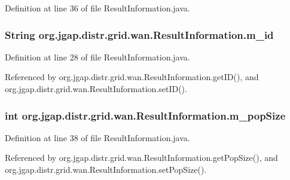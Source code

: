 Definition at line 36 of file Result\-Information.\-java.

\hypertarget{classorg_1_1jgap_1_1distr_1_1grid_1_1wan_1_1_result_information_a10d361eb8e7c6833893ade5b0f442fad}{
\subsubsection[{m\-\_\-id}]{\setlength{\rightskip}{0pt plus 5cm}String org.\-jgap.\-distr.\-grid.\-wan.\-Result\-Information.\-m\-\_\-id\hspace{0.3cm}{\ttfamily [private]}}}\label{classorg_1_1jgap_1_1distr_1_1grid_1_1wan_1_1_result_information_a10d361eb8e7c6833893ade5b0f442fad}


Definition at line 28 of file Result\-Information.\-java.



Referenced by org.\-jgap.\-distr.\-grid.\-wan.\-Result\-Information.\-get\-I\-D(), and org.\-jgap.\-distr.\-grid.\-wan.\-Result\-Information.\-set\-I\-D().

\hypertarget{classorg_1_1jgap_1_1distr_1_1grid_1_1wan_1_1_result_information_a2395c0e5db2fa94dd14c308ba339fc12}{
\subsubsection[{m\-\_\-pop\-Size}]{\setlength{\rightskip}{0pt plus 5cm}int org.\-jgap.\-distr.\-grid.\-wan.\-Result\-Information.\-m\-\_\-pop\-Size\hspace{0.3cm}{\ttfamily [private]}}}\label{classorg_1_1jgap_1_1distr_1_1grid_1_1wan_1_1_result_information_a2395c0e5db2fa94dd14c308ba339fc12}


Definition at line 38 of file Result\-Information.\-java.



Referenced by org.\-jgap.\-distr.\-grid.\-wan.\-Result\-Information.\-get\-Pop\-Size(), and org.\-jgap.\-distr.\-grid.\-wan.\-Result\-Information.\-set\-Pop\-Size().

